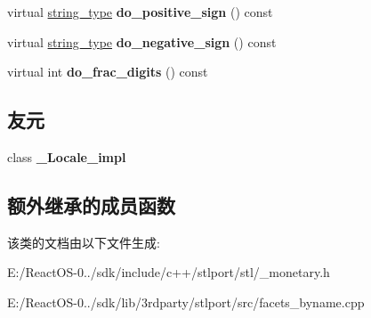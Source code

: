 \begin{DoxyCompactItemize}
\mbox{\label{classmoneypunct__byname_3_01char_00_01false_01_4_a179d4755875f458c9ca021b7ae9f89f1}} 
virtual \hyperlink{structstring}{string\+\_\+type} {\bfseries do\+\_\+positive\+\_\+sign} () const
\item 
\mbox{\label{classmoneypunct__byname_3_01char_00_01false_01_4_ae866062026a2b1bb6854f31deb454955}} 
virtual \hyperlink{structstring}{string\+\_\+type} {\bfseries do\+\_\+negative\+\_\+sign} () const
\item 
\mbox{\label{classmoneypunct__byname_3_01char_00_01false_01_4_af0003e7a922b37f81b7909dbd1874259}} 
virtual int {\bfseries do\+\_\+frac\+\_\+digits} () const
\end{DoxyCompactItemize}
\subsection*{友元}
\begin{DoxyCompactItemize}
\item 
\mbox{\label{classmoneypunct__byname_3_01char_00_01false_01_4_ae9c09ac7cd16ad35f8fdb1587ac77eb8}} 
class {\bfseries \+\_\+\+Locale\+\_\+impl}
\end{DoxyCompactItemize}
\subsection*{额外继承的成员函数}


该类的文档由以下文件生成\+:\begin{DoxyCompactItemize}
\item 
E\+:/\+React\+O\+S-\/0../sdk/include/c++/stlport/stl/\+\_\+monetary.\+h\item 
E\+:/\+React\+O\+S-\/0../sdk/lib/3rdparty/stlport/src/facets\+\_\+byname.\+cpp\end{DoxyCompactItemize}
